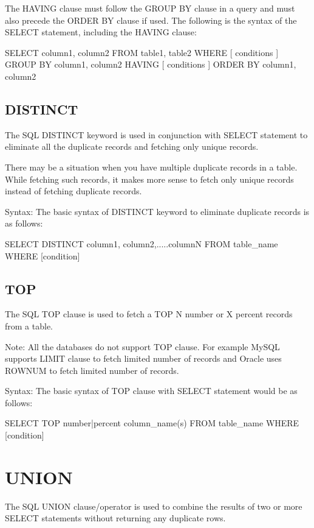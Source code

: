The HAVING clause must follow the GROUP BY clause in a query and must also precede the ORDER BY clause if used. The following is the syntax of the SELECT statement, including the 
HAVING clause:

\begin{Code}
	SELECT column1, column2
	FROM table1, table2
	WHERE [ conditions ]
	GROUP BY column1, column2
	HAVING [ conditions ]
	ORDER BY column1, column2
\end{Code}

\subsection{DISTINCT}
The SQL DISTINCT keyword is used in conjunction with SELECT statement to eliminate all the duplicate records and fetching only unique records.

There may be a situation when you have multiple duplicate records in a table. While fetching such records, it makes more sense to fetch only unique records instead of fetching 
duplicate records.

Syntax:
The basic syntax of DISTINCT keyword to eliminate duplicate records is as follows:

\begin{Code}
	SELECT DISTINCT column1, column2,.....columnN 
	FROM table_name
	WHERE [condition]
\end{Code}

\subsection{TOP}

The SQL TOP clause is used to fetch a TOP N number or X percent records from a table.

Note: All the databases do not support TOP clause. For example MySQL supports LIMIT clause to fetch limited number of records and Oracle uses ROWNUM to fetch limited number of 
records.

Syntax:
The basic syntax of TOP clause with SELECT statement would be as follows:

\begin{Code}
	SELECT TOP number|percent column_name(s)
	FROM table_name
	WHERE [condition]
\end{Code}

\section{UNION}
The SQL UNION clause/operator is used to combine the results of two or more SELECT statements without returning any duplicate rows.


